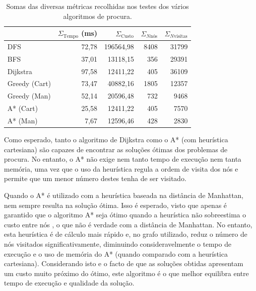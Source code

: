 \documentclass[12pt, a4paper, titlepage]{article}
\begin{document}
\begin{table}[H]
    \small

    \begin{adjustwidth}{-1.5cm}{-1.5cm}
        \begin{center}
            \begin{tabular}{|l|r|r|r|r|}
                \hline
                                               &
                    $\Sigma_\text{Tempo}$ (ms) &
                    $\Sigma_\text{Custo}$      &
                    $\Sigma_{N\text{nós}}$     &
                    $\Sigma_{N\text{visitas}}$ \\

                \hline
                DFS & 72,78 & 196564,98 & 8408 & 31799 \\
                \hline
                BFS & 37,01 & 13118,15 & 356 & 29391 \\
                \hline
                Dijkstra & 97,58 & 12411,22 & 405 & 36109 \\
                \hline
                Greedy (Cart) & 73,47 & 40882,16 & 1805 & 12357 \\
                \hline
                Greedy (Man) & 52,14 & 20596,48 & 732 & 9468 \\
                \hline
                A* (Cart) & 25,58 & 12411,22 & 405 & 7570 \\
                \hline
                A* (Man) & 7,67 & 12596,46 & 428 & 2830 \\
                \hline
            \end{tabular}
        \end{center}
    \end{adjustwidth}

    \caption{Somas das diversas métricas recolhidas nos testes dos vários algoritmos de procura.}
\end{table}

Como esperado, tanto o algoritmo de Dijkstra como o A* (com heurística cartesiana) são capazes de
encontrar as soluções ótimas dos problemas de procura. No entanto, o A* não exige nem tanto tempo de
execução nem tanta memória, uma vez que o uso da heurística regula a ordem de visita dos nós e
permite que um menor número destes tenha de ser visitado.

Quando o A* é utilizado com a heurística baseada na distância de Manhattan, nem sempre resulta na
solução ótima. Isso é esperado, visto que apenas é garantido que o algoritmo A* seja ótimo quando
a heurística não sobreestima o custo entre nós \cite{aima}, o que não é verdade com a distância de
Manhattan. No entanto, esta heurística é de cálculo mais rápido e, no grafo utilizado, reduz o
número de nós visitados significativamente, diminuindo consideravelmente o tempo de execução e o uso
de memória do A* (quando comparado com a heurística cartesiana). Considerando isto e o facto de que
as soluções obtidas apresentam um custo muito próximo do ótimo, este algoritmo é o que melhor
equilibra entre tempo de execução e qualidade da solução.
\end{document}
